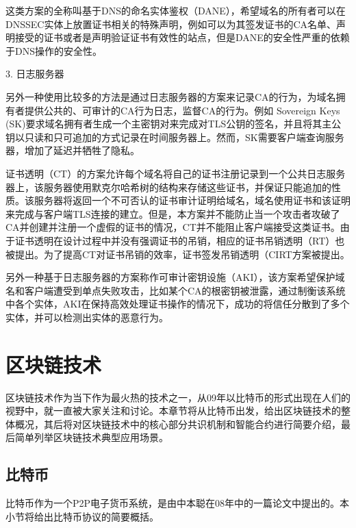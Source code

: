 这类方案的全称叫基于DNS的命名实体鉴权（DANE）\supercite{schlyter2012dns}，希望域名的所有者可以在DNSSEC实体上放置证书相关的特殊声明，例如可以为其签发证书的CA名单、声明接受的证书或者是声明验证证书有效性的站点，但是DANE的安全性严重的依赖于DNS操作的安全性。


3. 日志服务器

另外一种使用比较多的方法是通过日志服务器的方案来记录CA的行为，为域名拥有者提供公共的、可审计的CA行为日志，监督CA的行为。例如 Sovereign Keys (SK)\supercite{eckersleysovereign}要求域名拥有者生成一个主密钥对来完成对TLS公钥的签名，并且将其主公钥以只读和只可追加的方式记录在时间服务器上。然而，SK需要客户端查询服务器，增加了延迟并牺牲了隐私。

证书透明（CT）\supercite{laurie2013certificate}的方案允许每个域名将自己的证书注册记录到一个公共日志服务器上，该服务器使用默克尔哈希树的结构来存储这些证书，并保证只能追加的性质。该服务器将返回一个不可否认的证书审计证明给域名，域名使用证书和该证明来完成与客户端TLS连接的建立。但是，本方案并不能防止当一个攻击者攻破了CA并创建并注册一个虚假的证书的情况，CT并不能阻止客户端接受这类证书。由于证书透明在设计过程中并没有强调证书的吊销，相应的证书吊销透明（RT）\supercite{laurie2012revocation}也被提出。为了提高CT对证书吊销的效率，证书签发吊销透明（CIRT\supercite{ryan2014enhanced}方案被提出。

另外一种基于日志服务器的方案称作可审计密钥设施（AKI）\supercite{kim2013accountable}，该方案希望保护域名和客户端遭受到单点失败攻击，比如某个CA的根密钥被泄露，通过制衡该系统中各个实体，AKI在保持高效处理证书操作的情况下，成功的将信任分散到了多个实体，并可以检测出实体的恶意行为。






\section{区块链技术}




区块链技术作为当下作为最火热的技术之一，从09年以比特币的形式出现在人们的视野中，就一直被大家关注和讨论。本章节将从比特币出发，给出区块链技术的整体概况，其后将对区块链技术中的核心部分共识机制和智能合约进行简要介绍，最后简单列举区块链技术典型应用场景。

\subsection{比特币}


比特币作为一个P2P电子货币系统，是由中本聪在08年中的一篇论文中提出\supercite{nakamoto2008bitcoin}的。本小节将给出比特币协议的简要概括。



